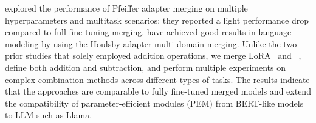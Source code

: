 \citet{qin2022exploring} explored the performance of Pfeiffer adapter merging on multiple hyperparameters and multitask scenarios; they reported a light performance drop compared to full fine-tuning merging.
\citet{chronopoulou2023adaptersoup} have achieved good results in language modeling by using the Houlsby adapter multi-domain merging.
Unlike the two prior studies that solely employed addition operations, we merge LoRA~\citep{hu2021lora} and \ia~\citep{liu2022few}, define both  addition and subtraction, and perform multiple experiments on complex combination methods across different types of tasks. 
The results indicate that the approaches are comparable to fully fine-tuned merged models and extend the compatibility of parameter-efficient modules (PEM) from BERT-like models to LLM such as Llama.
